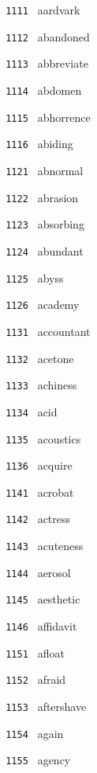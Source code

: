 \documentclass[11pt]{article}
\begin{document}
\begin{multicols}{6}
\footnotesize
\noindent \texttt{ 1111 } aardvark  \par
\noindent \texttt{ 1112 } abandoned  \par
\noindent \texttt{ 1113 } abbreviate  \par
\noindent \texttt{ 1114 } abdomen  \par
\noindent \texttt{ 1115 } abhorrence  \par
\noindent \texttt{ 1116 } abiding  \par
\vspace{3mm}
\noindent \texttt{ 1121 } abnormal  \par
\noindent \texttt{ 1122 } abrasion  \par
\noindent \texttt{ 1123 } absorbing  \par
\noindent \texttt{ 1124 } abundant  \par
\noindent \texttt{ 1125 } abyss  \par
\noindent \texttt{ 1126 } academy  \par
\vspace{3mm}
\noindent \texttt{ 1131 } accountant  \par
\noindent \texttt{ 1132 } acetone  \par
\noindent \texttt{ 1133 } achiness  \par
\noindent \texttt{ 1134 } acid  \par
\noindent \texttt{ 1135 } acoustics  \par
\noindent \texttt{ 1136 } acquire  \par
\vspace{3mm}
\noindent \texttt{ 1141 } acrobat  \par
\noindent \texttt{ 1142 } actress  \par
\noindent \texttt{ 1143 } acuteness  \par
\noindent \texttt{ 1144 } aerosol  \par
\noindent \texttt{ 1145 } aesthetic  \par
\noindent \texttt{ 1146 } affidavit  \par
\vspace{3mm}
\noindent \texttt{ 1151 } afloat  \par
\noindent \texttt{ 1152 } afraid  \par
\noindent \texttt{ 1153 } aftershave  \par
\noindent \texttt{ 1154 } again  \par
\noindent \texttt{ 1155 } agency  \par

\end{multicols}
\end{document}
